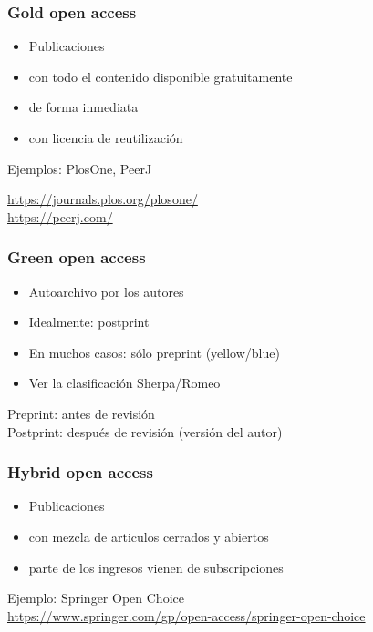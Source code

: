 \documentclass[17pt,aspectratio=169]{beamer}
\begin{document}
\begin{frame}
\frametitle{Gold open access}

\begin{itemize}
\item Publicaciones
\item con todo el contenido disponible gratuitamente
\item de forma inmediata
\item con licencia de reutilización
\end{itemize}

Ejemplos: PlosOne, PeerJ

\begin{flushright}
  \url{https://journals.plos.org/plosone/} \\
  \url{https://peerj.com/} \\
\end{flushright}
\end{frame}

\begin{frame}
\frametitle{Green open access}

\begin{itemize}
\item Autoarchivo por los autores
\item Idealmente: postprint
\item En muchos casos: sólo preprint (yellow/blue)
\item Ver la clasificación Sherpa/Romeo
\end{itemize}

\vspace{.5cm}

Preprint: antes de revisión \\
Postprint: después de revisión (versión del autor) \\
\end{frame}

\begin{frame}
\frametitle{Hybrid open access}

\begin{itemize}
\item Publicaciones
\item con mezcla de articulos cerrados y abiertos
\item parte de los ingresos vienen de subscripciones
\end{itemize}

\begin{flushright}
  Ejemplo: Springer Open Choice \\
  {\small \url{https://www.springer.com/gp/open-access/springer-open-choice}} \\
\end{flushright}
\end{frame}
\end{document}
